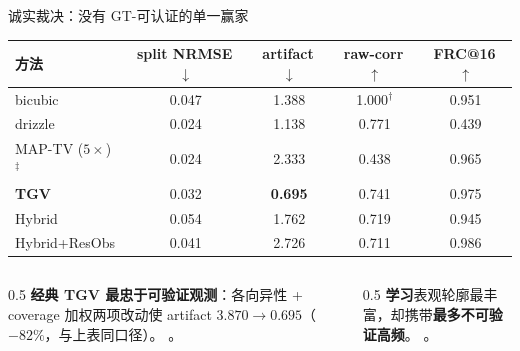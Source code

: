 \begin{frame}{诚实裁决：没有 GT-可认证的单一赢家}
  \footnotesize
  \begin{center}
  \begin{tabular}{@{}lcccc@{}}
    \toprule
    方法 & split NRMSE\,$\downarrow$ & artifact\,$\downarrow$ & raw-corr\,$\uparrow$ & FRC@16\,$\uparrow$ \\
    \midrule
    bicubic           & 0.047 & 1.388 & 1.000$^\dagger$ & 0.951 \\
    drizzle           & 0.024 & 1.138 & 0.771 & 0.439 \\
    MAP-TV ($5\times$)$^\ddagger$ & 0.024 & 2.333 & 0.438 & 0.965 \\
    \textbf{TGV}      & 0.032 & \textbf{0.695} & 0.741 & 0.975 \\
    Hybrid            & 0.054 & 1.762 & 0.719 & 0.945 \\
    Hybrid+ResObs     & 0.041 & 2.726 & 0.711 & 0.986 \\
    \bottomrule
  \end{tabular}
  \end{center}
  \begin{columns}[T]
    \begin{column}{0.5\textwidth}
      \footnotesize
      \textbf{经典 TGV 最忠于可验证观测}：各向异性 + coverage 加权两项改动使
      artifact $3.870\!\to\!0.695$（$-82\%$，与上表同口径）。
      。
    \end{column}
    \begin{column}{0.5\textwidth}
      \footnotesize
      \textbf{学习}表观轮廓最丰富，却携带\textbf{最多不可验证高频}。
      。
    \end{column}
  \end{columns}
\end{frame}
